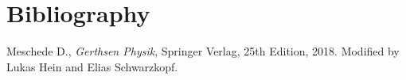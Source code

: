 \section{Bibliography}
\begin{thebibliography}{99}
    Meschede D., \emph{Gerthsen Physik}, Springer Verlag, 25th Edition, 2018. Modified by Lukas Hein
    and Elias Schwarzkopf.
\end{thebibliography}
